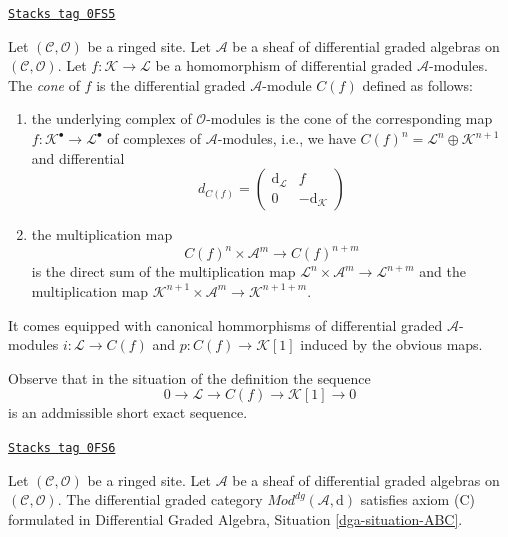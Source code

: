 \begin{definition}[Cone]
\label{sdga-definition-cone}
\href{https://stacks.math.columbia.edu/tag/0FS5}{\texttt{Stacks tag 0FS5}}

Let $(\mathcal{C}, \mathcal{O})$ be a ringed site.
Let $\mathcal{A}$ be a sheaf of differential graded algebras
on $(\mathcal{C}, \mathcal{O})$.
Let $f : \mathcal{K} \to \mathcal{L}$
be a homomorphism of differential graded $\mathcal{A}$-modules.
The {\it cone} of $f$ is the differential graded $\mathcal{A}$-module
$C(f)$ defined as follows:
\begin{enumerate}
\item the underlying complex of $\mathcal{O}$-modules
is the cone of the corresponding map
$f : \mathcal{K}^\bullet \to \mathcal{L}^\bullet$ of
complexes of $\mathcal{A}$-modules, i.e., we have
$C(f)^n = \mathcal{L}^n \oplus \mathcal{K}^{n + 1}$ and
differential
$$
d_{C(f)} =
\left(
\begin{matrix}
\text{d}_\mathcal{L} & f \\
0 & -\text{d}_\mathcal{K}
\end{matrix}
\right)
$$
\item the multiplication map
$$
C(f)^n \times \mathcal{A}^m \to C(f)^{n + m}
$$
is the direct sum of the multiplication map
$\mathcal{L}^n \times \mathcal{A}^m \to \mathcal{L}^{n + m}$
and the multiplication map
$\mathcal{K}^{n + 1} \times \mathcal{A}^m \to \mathcal{K}^{n + 1 + m}$.
\end{enumerate}
It comes equipped with canonical hommorphisms of differential graded
$\mathcal{A}$-modules $i : \mathcal{L} \to C(f)$
and $p : C(f) \to \mathcal{K}[1]$ induced by the obvious maps.
\end{definition}

Observe that in the situation of the definition the sequence
$$
0 \to \mathcal{L} \to C(f) \to \mathcal{K}[1] \to 0
$$
is an addmissible short exact sequence.

\begin{lemma}[Axiom C]
\label{sdga-lemma-axiom-C}
\href{https://stacks.math.columbia.edu/tag/0FS6}{\texttt{Stacks tag 0FS6}}

Let $(\mathcal{C}, \mathcal{O})$ be a ringed site.
Let $\mathcal{A}$ be a sheaf of differential graded algebras
on $(\mathcal{C}, \mathcal{O})$.
The differential graded category
$\textit{Mod}^{dg}(\mathcal{A}, \text{d})$
satisfies axiom (C) formulated in
Differential Graded Algebra, Situation \ref{dga-situation-ABC}.
\end{lemma}

